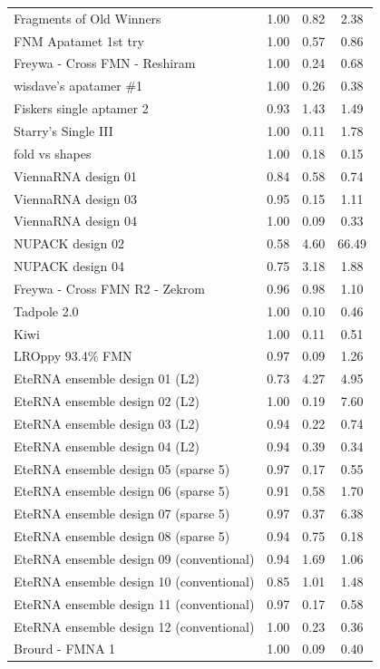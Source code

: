 \documentclass[letter]{bioinfo}
\begin{document}
\begin{center}
\begin{longtable}{l ccc}
Fragments of Old Winners		&1.00	&0.82	&2.38 \\
FNM Apatamet 1st try			&1.00 	&0.57 	&0.86 \\
Freywa - Cross FMN - Reshiram	&1.00 	&0.24 	&0.68 \\
wisdave's apatamer \#1			&1.00 	&0.26 	&0.38 \\
Fiskers single aptamer 2		&0.93 	&1.43 	&1.49 \\
Starry's Single III			&1.00 	&0.11 	&1.78 \\
fold vs shapes				&1.00 	&0.18 	&0.15 \\
ViennaRNA design 01			&0.84 	&0.58 	&0.74 \\
ViennaRNA design 03			&0.95 	&0.15 	&1.11 \\
ViennaRNA design 04			&1.00 	&0.09 	&0.33 \\
NUPACK design 02				&0.58 	&4.60 	&66.49 \\
NUPACK design 04				&0.75 	&3.18 	&1.88 \\
Freywa - Cross FMN R2 - Zekrom	&0.96 	&0.98 	&1.10 \\
Tadpole 2.0					&1.00 	&0.10 	&0.46 \\
Kiwi							&1.00 	&0.11 	&0.51 \\
LROppy 93.4\% FMN				&0.97 	&0.09 	&1.26 \\
EteRNA ensemble design 01 (L2)	&0.73 	&4.27 	&4.95 \\
EteRNA ensemble design 02 (L2)	&1.00 	&0.19 	&7.60 \\
EteRNA ensemble design 03 (L2)	&0.94 	&0.22 	&0.74 \\
EteRNA ensemble design 04 (L2)	&0.94 	&0.39 	&0.34 \\
EteRNA ensemble design 05 (sparse 5)		&0.97 	&0.17 	&0.55 \\
EteRNA ensemble design 06 (sparse 5)		&0.91 	&0.58 	&1.70 \\
EteRNA ensemble design 07 (sparse 5)		&0.97 	&0.37 	&6.38 \\
EteRNA ensemble design 08 (sparse 5)		&0.94 	&0.75 	&0.18 \\
EteRNA ensemble design 09 (conventional)		&0.94 	&1.69 	&1.06 \\
EteRNA ensemble design 10 (conventional)		&0.85 	&1.01 	&1.48 \\
EteRNA ensemble design 11 (conventional)		&0.97 	&0.17 	&0.58 \\
EteRNA ensemble design 12 (conventional)		&1.00 	&0.23 	&0.36 \\
Brourd - FMNA 1			&1.00 	&0.09 	&0.40 \\

\end{longtable}
\end{center}
\end{document}
